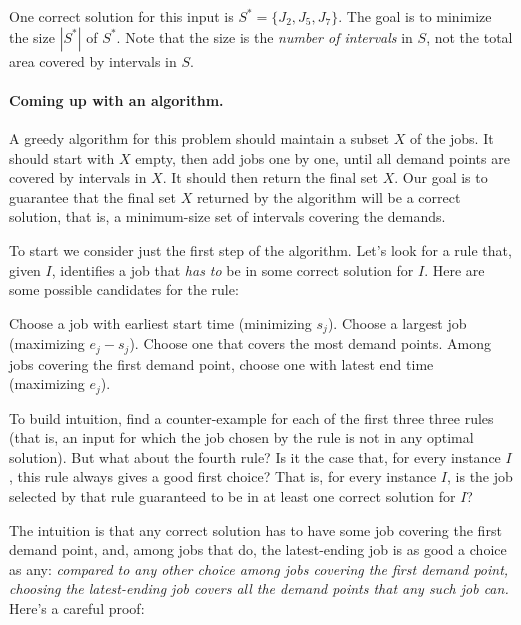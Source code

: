 \smallskip

One correct solution for this input is $S^*= \{J_2, J_5, J_7\}$.
The goal is to minimize the size $|S^*|$ of $S^*$.
Note that the size is the \emph{number of intervals} in $S$,
not the total area covered by intervals in $S$.

\paragraph{Coming up with an algorithm.}

A greedy algorithm for this problem should maintain a subset $X$ of the jobs.
It should start with $X$ empty, then add jobs one by one,
until all demand points are covered by intervals in $X$.
It should then return the final set $X$.
Our goal is to guarantee that the final set $X$ returned by the algorithm will be a correct solution,
that is, a minimum-size set of intervals covering the demands.

To start we consider just the first step of the algorithm.
Let's look for a rule that, given $I$, 
identifies a job that \emph{has to} be in some correct solution for $I$.
Here are some possible candidates for the rule:
\begin{steps}
  \step Choose a job with earliest start time (minimizing $s_j$). 
  \step Choose a largest job (maximizing $e_j - s_j$).
  \step Choose one that covers the most demand points.
  \step Among jobs covering the first demand point,
  choose one with latest end time (maximizing $e_j$). 
\end{steps}

To build intuition, find a counter-example for each of the first three three rules
(that is, an input for which the job chosen by the rule is not in any optimal solution).
But what about the fourth rule?
Is it the case that, for every instance $I$,
this rule always gives a good first choice?
That is, for every instance $I$,
is the job selected by that rule guaranteed to be in at least one correct solution for $I$?

The intuition is that any correct solution has to have some job covering the first demand point,
and, among jobs that do, the latest-ending job is as good a choice as any:
\emph{compared to any other choice among jobs covering the first demand point,
  choosing the latest-ending job covers all the demand points that any such job can.}
Here's a careful proof:

